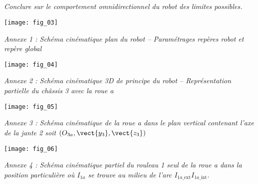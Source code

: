 \subparagraph{}
\textit{Conclure sur le comportement omnidirectionnel du robot des limites possibles.}
\ifprof%
\begin{corrige}
\end{corrige}\else\fi



\begin{center}
\texttt{[image: fig\_03]}

\textit{Annexe 1 : Schéma cinématique plan du robot -- Paramétrages repères robot et repère global}
\end{center}
\begin{center}
\texttt{[image: fig\_04]}

\textit{Annexe 2 : Schéma cinématique 3D de principe du robot -- Représentation partielle du châssis 3 avec la roue a}
\end{center}
\begin{center}
\texttt{[image: fig\_05]}

\textit{Annexe 3 : Schéma cinématique de la roue a dans le plan vertical contenant l'axe de la jante 2 soit $\left( O_{3a},\vect{y_3},\vect{z_3}\right)$}
\end{center}
\begin{center}
\texttt{[image: fig\_06]}

\textit{Annexe 4 : Schéma cinématique partiel du rouleau 1 seul de la roue a dans la position particulière où $I_{1a}$ se trouve au milieu de l'arc $I_{1a\_\text{ext}}I_{1a\_\text{int}}$.}

\end{center}
